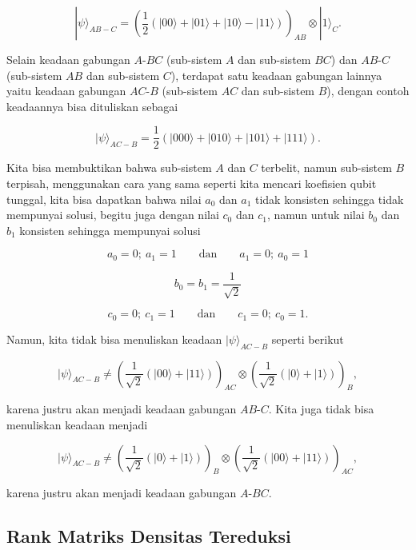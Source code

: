 \begin{equation}
|\psi\rangle_{AB-C}
=
\left(
\frac{1}{2}
(|00\rangle + |01\rangle + |10\rangle - |11\rangle)
\right)_{AB}
\otimes
|1\rangle_C .
\end{equation}

Selain keadaan gabungan $A$-$BC$ (sub-sistem $A$ dan sub-sistem $BC$) dan $AB$-$C$ (sub-sistem $AB$ dan sub-sistem $C$), terdapat satu keadaan gabungan lainnya yaitu keadaan gabungan $AC$-$B$ (sub-sistem $AC$ dan sub-sistem $B$), dengan contoh
keadaannya bisa dituliskan sebagai

\begin{equation}
|\psi\rangle_{AC-B}
=
\frac{1}{2}
\left(
|000\rangle + |010\rangle + |101\rangle + |111\rangle
\right) .
\end{equation}

Kita bisa membuktikan bahwa sub-sistem $A$ dan $C$ terbelit, namun sub-sistem $B$ terpisah, menggunakan cara yang sama seperti kita mencari koefisien qubit tunggal, kita bisa dapatkan bahwa nilai $a_0$ dan $a_1$ tidak konsisten sehingga tidak mempunyai solusi, begitu juga dengan nilai $c_0$ dan $c_1$, namun untuk nilai $b_0$ dan $b_1$ konsisten sehingga mempunyai solusi

\[
a_0 = 0 ; \ a_1 = 1
\qquad
\text{dan}
\qquad
a_1 = 0 ; \ a_0 = 1
\]

\[
b_0 = b_1 = \frac{1}{\sqrt{2}}
\]

\[
c_0 = 0 ; \ c_1 = 1
\qquad
\text{dan}
\qquad
c_1 = 0 ; \ c_0 = 1 .
\]

Namun, kita tidak bisa menuliskan keadaan $|\psi\rangle_{AC-B}$ seperti berikut

\begin{equation}
|\psi\rangle_{AC-B}
\neq
\left(
\frac{1}{\sqrt{2}}
(|00\rangle + |11\rangle)
\right)_{AC}
\otimes
\left(
\frac{1}{\sqrt{2}}
(|0\rangle + |1\rangle)
\right)_B ,
\end{equation}

karena justru akan menjadi keadaan gabungan $AB$-$C$. Kita juga tidak bisa menuliskan keadaan menjadi

\begin{equation}
|\psi\rangle_{AC-B}
\neq
\left(
\frac{1}{\sqrt{2}}
(|0\rangle + |1\rangle)
\right)_B
\otimes
\left(
\frac{1}{\sqrt{2}}
(|00\rangle + |11\rangle)
\right)_{AC} ,
\end{equation}

karena justru akan menjadi keadaan gabungan $A$-$BC$.

\subsection{Rank Matriks Densitas Tereduksi}

